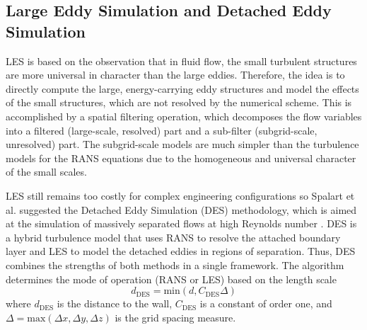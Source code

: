 \subsection{Large Eddy Simulation and Detached Eddy Simulation}

LES is based on the observation that in fluid flow, the small turbulent structures are more universal in character than the large eddies. Therefore, the idea is to directly compute the large, energy-carrying eddy structures and model the effects of the small structures, which are not resolved by the numerical scheme. This is accomplished by a spatial filtering operation, which decomposes the flow variables into a filtered (large-scale, resolved) part and a sub-filter (subgrid-scale, unresolved) part. The subgrid-scale models are much simpler than the turbulence models for the RANS equations due to the homogeneous and universal character of the small scales.

LES still remains too costly for complex engineering configurations so Spalart et al. suggested the Detached Eddy Simulation (DES) methodology, which is aimed at the simulation of massively separated flows at high Reynolds number \cite{Spalart1997,Spalart2000}. DES is a hybrid turbulence model that uses RANS to resolve the attached boundary layer and LES to model the detached eddies in regions of separation. Thus, DES combines the strengths of both methods in a single framework. The algorithm determines the mode of operation (RANS or LES) based on the length scale
%
\begin{equation}\label{eq:DES_d}
    d_{\text{DES}} = \textrm{min}(d, C_{\text{DES}}\Delta)
\end{equation}
%
where $d_{\text{DES}}$ is the distance to the wall, $C_{\text{DES}}$ is a constant of order one, and $\Delta = \textrm{max}(\Delta x, \Delta y, \Delta z)$ is the grid spacing measure.


